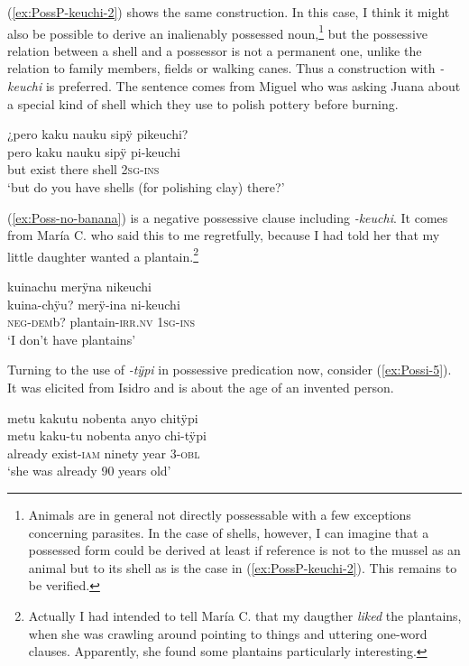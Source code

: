 (\ref{ex:PossP-keuchi-2}) shows the same construction. In this case, I think it might also be possible to derive an inalienably possessed noun,\footnote{Animals are in general not directly possessable with a few exceptions concerning parasites. In the case of shells, however, I can imagine that a possessed form could be derived at least if reference is not to the mussel as an animal but to its shell as is the case in (\ref{ex:PossP-keuchi-2}). This remains to be verified.} but the possessive relation between a shell and a possessor is not a permanent one, unlike the relation to family members, fields or walking canes. Thus a construction with \textit{-keuchi} is preferred. The sentence comes from Miguel who was asking Juana about a special kind of shell which they use to polish pottery before burning.

\ea\label{ex:PossP-keuchi-2}
\begingl 
\glpreamble ¿pero kaku nauku sipÿ pikeuchi?\\
\gla pero kaku nauku sipÿ pi-keuchi\\ 
\glb but exist there shell 2\textsc{sg}-\textsc{ins}\\ 
\glft ‘but do you have shells (for polishing clay) there?’\\ 
\endgl
\trailingcitation{[jmx-d110918ls-1.098]}
\xe

(\ref{ex:Poss-no-banana}) is a negative possessive clause including \textit{-keuchi}. It comes from María C. who said this to me regretfully, because I had told her that my little daughter wanted a plantain.\footnote{Actually I had intended to tell María C. that my daugther \textit{liked} the plantains, when she was crawling around pointing to things and uttering one-word clauses. Apparently, she found some plantains particularly interesting.}

\ea\label{ex:Poss-no-banana}
\begingl 
\glpreamble kuinachu merÿna nikeuchi\\
\gla kuina-chÿu? merÿ-ina ni-keuchi\\ 
\glb \textsc{neg}-\textsc{dem}b? plantain-\textsc{irr.nv} 1\textsc{sg}-\textsc{ins}\\ 
\glft ‘I don’t have plantains’\\ 
\endgl
\trailingcitation{[uxx-p110825l.173]}
\xe

Turning to the use of \textit{-tÿpi} in possessive predication now, consider (\ref{ex:Possi-5}). It was elicited from Isidro and is about the age of an invented person.

\ea\label{ex:Possi-5}
\begingl 
\glpreamble metu kakutu nobenta anyo chitÿpi\\
\gla metu kaku-tu nobenta anyo chi-tÿpi\\ 
\glb already exist-\textsc{iam} ninety year 3-\textsc{obl}\\ 
\glft ‘she was already 90 years old’\\ 
\endgl
\trailingcitation{[dxx-d120416s.203]}
\xe

